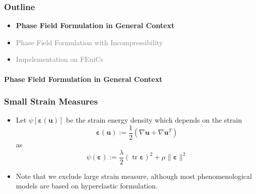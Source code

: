 \documentclass{beamer}
\newcommand{\SectionOne}{Phase Field Formulation in Dynamic Context}
\newcommand{\SectionTwo}{Phase Field Formulation in General Context}
\newcommand{\SectionThree}{Phase Field Formulation with Incompressibility}
\newcommand{\SectionFour}{Impelementation on FEniCs}
\DeclareMathOperator{\trace}{tr}
\begin{document}
\begin{frame}
	\frametitle{Outline}
	\begin{itemize}
		\setlength\itemsep{2em}
		\item \textbf{\SectionTwo}
		\item \textcolor{gray}{\SectionThree}
		\item \textcolor{gray}{\SectionFour}
	\end{itemize}
\end{frame}

\begin{frame}
	\framesubtitle{\SectionTwo}
	\frametitle{Small Strain Measures}
	\begin{itemize}
		\setlength\itemsep{2em}
		\item Let $\psi[\bm{\varepsilon}(\bm{u})]$ be the strain energy density which depends on the strain
		\begin{equation*}
		\label{aeq:4} \bm{\varepsilon}(\bm{u}) := 
		\frac{1}{2}\left(\nabla \bm{u}+\nabla \bm{u}^T\right)
		\end{equation*}
		as
		\begin{equation*}
		\psi(\bm{\varepsilon}) := \frac{\lambda}{2} (\trace\bm{\varepsilon})^2 + \mu \|\bm{\varepsilon}\|^2
		\end{equation*}
		\item Note that we exclude large strain measure, although most phenomenological models are based on hyperelastic formulation.
	\end{itemize}
\end{frame}
\end{document}
